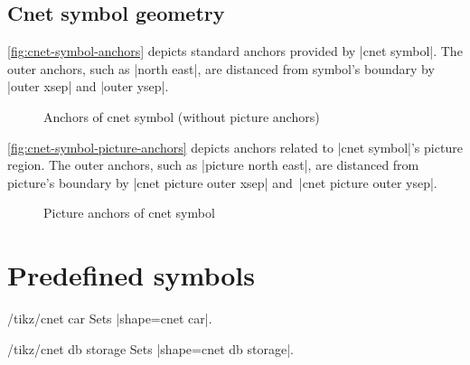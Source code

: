 \documentclass[a4paper]{ltxdoc}
\begin{document}
\subsection{Cnet symbol geometry}
\label{sec:cnet-symbol-geometry}

\autoref{fig:cnet-symbol-anchors} depicts standard anchors provided by
|cnet symbol|. The outer anchors, such as |north east|, are distanced from
symbol's boundary by |outer xsep| and |outer ysep|.
\begin{figure}[htbp]
  \begin{center}
  \end{center}
  \caption{Anchors of cnet symbol (without picture anchors)}
  \label{fig:cnet-symbol-anchors}
\end{figure}

\autoref{fig:cnet-symbol-picture-anchors} depicts anchors related to
|cnet symbol|'s picture region. The outer anchors, such as |picture north east|,
are distanced from picture's boundary by |cnet picture outer xsep|
and~|cnet picture outer ysep|.
\begin{figure}[htbp]
  \begin{center}
  \end{center}
  \caption{Picture anchors of cnet symbol}
  \label{fig:cnet-symbol-picture-anchors}
\end{figure}

\section{Predefined symbols}
\label{sec:predefined-symbols}

\begin{stylekey}{/tikz/cnet car}
Sets |shape={cnet car}|.
\begin{codeexample}[preamble={\usetikzlibrary{shapes.cnet.car}}]
\end{codeexample}
\end{stylekey}

\begin{stylekey}{/tikz/cnet db storage}
Sets |shape={cnet db storage}|.
\begin{codeexample}[preamble={\usetikzlibrary{shapes.cnet.dbstorage}}]
\end{codeexample}
\end{stylekey}
\end{document}
